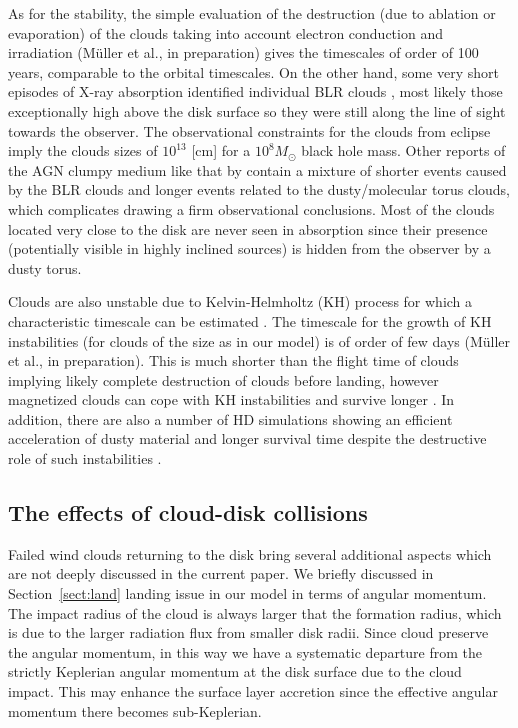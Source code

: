 \documentclass[twocolumn]{aastex62}
\begin{document}
As for the stability, the simple evaluation of the destruction (due to ablation or evaporation) of the clouds taking into account electron conduction and irradiation (M\"uller et al., in preparation) gives the timescales of order of 100 years, comparable to the orbital timescales. On the other hand, some very short episodes of X-ray absorption identified individual BLR clouds \citep{risaliti2011, torricelli2014}, most likely those exceptionally high above the disk surface so they were still along the line of sight towards the observer. The observational constraints for the clouds from eclipse \citep{pietrini2019} imply the clouds sizes of $10^{13}$ [cm] for a $10^8 M_{\odot}$ black hole mass. Other reports of the AGN clumpy medium like that by \citet{markowitz2014} contain a mixture of shorter events caused by the BLR clouds and longer events related to the dusty/molecular torus clouds, which complicates drawing a firm observational conclusions. Most of the clouds located very close to the disk are never seen in absorption since their presence (potentially visible in highly inclined sources) is hidden from the observer by a dusty torus.

Clouds are also unstable due to Kelvin-Helmholtz (KH) process for which a characteristic timescale can be estimated \citep[see e.g.][]{peisker2020}. The timescale for the growth of KH instabilities (for clouds of the size as in our model) is of order of few days (M\"uller et al., in preparation). This is much shorter than the flight time of clouds implying likely complete destruction of clouds before landing, however magnetized clouds can cope with KH instabilities \citep{McCourt2015} and survive longer \citep{shin2008}. In addition, there are also a number of HD simulations showing an efficient acceleration of dusty material and longer survival time despite the destructive role of such instabilities \citep[see e.g.][]{davis2014, tsang2015, zhang2017, zhang2018}.

\subsection{The effects of cloud-disk collisions}

Failed wind clouds returning to the disk bring several additional aspects which are not deeply discussed in the current paper. We  briefly discussed in Section~\ref{sect:land} landing issue in our model in terms of angular momentum. The impact radius of the cloud is always larger that the formation radius, which is due to the larger radiation flux from smaller disk radii. Since cloud preserve the angular momentum, in this way we have a systematic departure from the strictly Keplerian angular momentum at the disk surface due to the cloud impact. This may enhance the surface layer accretion since the effective angular momentum there becomes sub-Keplerian.
\end{document}
